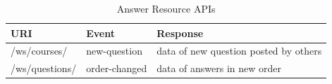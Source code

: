 \begin{table}[!htbp]
\centering
\begin{tabularx}{\textwidth}{@{}llX@{}}
\toprule
URI                       & Event           & Response                           \\ \midrule
/ws/courses/            & new-question       &  data of new question posted by others \\
/ws/questions/          & order-changed      &  data of answers in new order          \\ \bottomrule
\end{tabularx}
\caption{Answer Resource APIs}
\label{table:websocket-def}
\end{table}

